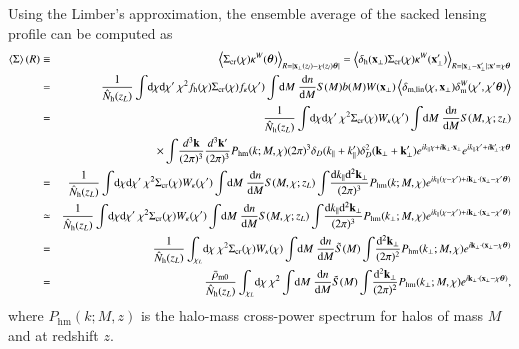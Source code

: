 \documentclass[onecolumn,notitlepage,showpacs,amsmath,amssymb,prd,floatfix]{revtex4-1}
\def\ave#1{\left\langle #1 \right\rangle}
\newcommand{\bx}{{\bf x}}
\newcommand{\bk}{{\bf k}}
\newcommand{\btheta}{{\bm{\theta}}}
\newcommand{\dr}{\mathrm{d}}
\newcommand{\deltam}{\delta_{\mathrm{m}}}
\newcommand{\deltaml}{\delta_{\mathrm{m,lin}}}
\newcommand{\deltah}{\delta_{\mathrm{h}}}
\newcommand{\phm}{P_{\mathrm{hm}}}
\newcommand{\bh}{\mathrm{h}}
\newcommand{\bnh}{\frac{\dr n}{\dr M}}
\newcommand{\sigmacr}{\Sigma_{\rm cr}}
\newcommand{\hNh}{\hat{N}_{\rm h}}
\begin{document}
Using the Limber's approximation, the ensemble average of the sacked
lensing profile can be computed as
%
\begin{eqnarray}
 \ave{\Sigma}(R)&\equiv&\ave{\sigmacr(\chi)\kappa^W(\btheta)}_{R=|\bx_\perp(z_l)-\chi(z_l)\btheta|}
=\ave{\deltah(\bx_\perp)\sigmacr(\chi)\kappa^W(\bx'_\perp)}_{R=|\bx_\perp-\bx'_\perp|;\bx'=\chi\btheta}
\nonumber\\
  &=&
  \frac{1}{\hNh(z_L)}\int\!\dr\chi \dr\chi'~\chi^2 f_\bh(\chi)\sigmacr(\chi)f_\kappa(\chi')
  \int\!\dr M~\bnh S(M)b(M)W(\bx_\perp)\ave{\deltaml(\chi,\bx_\perp)\deltam^W(\chi',\chi'\btheta)}
  \nonumber\\
&=& \frac{1}{\hat{N}_\bh(z_L)}\int\!\dr\chi \dr\chi'~\chi^2\sigmacr(\chi)W_\kappa(\chi')
 \int\!\dr M~\frac{\dr n}{\dr M}S(M,\chi;z_L)\nonumber\\
&&\hspace{6em}\times \int\!\frac{d^3\bk}{(2\pi)^3}\frac{d^3\bk'}{(2\pi)^3}
\phm(k;M,\chi)(2\pi)^3\delta_D(k_\parallel+k'_\parallel)\delta_D^2(\bk_\perp+\bk'_\perp)
e^{ik_\parallel\chi+i\bk_\perp\cdot\bx_\perp}
e^{ik_\parallel\chi'+i\bk'_\perp\cdot\chi\btheta}
  \nonumber\\ 
&=& \frac{1}{\hat{N}_\bh(z_L)}\int\!\dr\chi \dr\chi'~\chi^2\sigmacr(\chi)W_\kappa(\chi')
 \int\!\dr M~\frac{\dr n}{\dr M}S(M,\chi;z_L)
\int\!\frac{\dr k_\parallel \dr^2\bk_\perp}{(2\pi)^3}
\phm(k;M,\chi)
e^{ik_\parallel(\chi-\chi')+i\bk_\perp\cdot(\bx_\perp-\chi'\btheta)}
  \nonumber\\ 
&\simeq & \frac{1}{\hat{N}_\bh(z_L)}\int\!\dr\chi \dr\chi'~\chi^2\sigmacr(\chi)W_\kappa(\chi')
 \int\!\dr M~\frac{\dr n}{\dr M}S(M,\chi;z_L)
\int\!\frac{\dr k_\parallel \dr^2\bk_\perp}{(2\pi)^3}
\phm(k_\perp;M,\chi)
e^{ik_\parallel(\chi-\chi')+i\bk_\perp\cdot(\bx_\perp-\chi'\btheta)}
  \nonumber\\ 
&= & \frac{1}{\hat{N}_\bh(z_L)}\int_{\chi_L}\!\dr\chi ~\chi^2\sigmacr(\chi)W_\kappa(\chi)
 \int\!\dr M~\frac{\dr n}{\dr M}\tilde{S}(M)
\int\!\frac{\dr^2\bk_\perp}{(2\pi)^2}
\phm(k_\perp;M,\chi)
e^{i\bk_\perp\cdot(\bx_\perp-\chi\btheta)}
\nonumber\\
&=&\frac{\bar{\rho}_{\rm m0}}{\hat{N}_\bh(z_L)}\int_{\chi_L}\!\dr\chi ~\chi^2
 \int\!\dr M~\frac{\dr n}{\dr M}\tilde{S}(M)
\int\!\frac{\dr^2\bk_\perp}{(2\pi)^2}
\phm(k_\perp;M,\chi)
e^{i\bk_\perp\cdot(\bx_\perp-\chi\btheta)},
\end{eqnarray}
%
where $\phm(k;M,z)$ is the halo-mass cross-power spectrum for halos of
mass $M$ and at redshift $z$.
\end{document}
